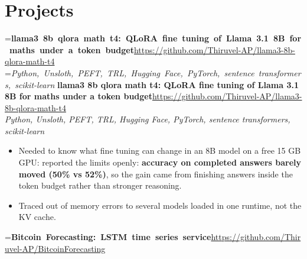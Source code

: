 \documentclass[a4paper,11pt]{article}
\newcommand{\project}[3]{%
  \textbf{#1}\hfill#3\\ {\color{muted}\small\textit{#2}}\par}
\newcommand{\gap}{\vspace{5pt}}
\newcommand{\num}[1]{\textbf{#1}}   %
\begin{document}
\section{Projects}
=\hbox{\textbf{llama3 8b qlora math t4: QLoRA fine tuning of Llama 3.1 8B for maths under a token budget}\hspace{1em}\url{https://github.com/Thiruvel-AP/llama3-8b-qlora-math-t4}}%
=\hbox{{\small\textit{Python, Unsloth, PEFT, TRL, Hugging Face, PyTorch, sentence transformers, scikit-learn}}}%
\ifdim\wd0>\linewidth
\ifdim\wd2>\linewidth
\textbf{llama3 8b qlora math t4: QLoRA fine tuning of Llama 3.1 8B for maths under a token budget}\\ {\color{muted}\small\textit{Python, Unsloth, PEFT, TRL, Hugging Face, PyTorch, sentence transformers, scikit-learn}}\\ \hspace*{\fill}{\small\url{https://github.com/Thiruvel-AP/llama3-8b-qlora-math-t4}}\par
\else
\textbf{llama3 8b qlora math t4: QLoRA fine tuning of Llama 3.1 8B for maths under a token budget}\\ {\color{muted}\small\textit{Python, Unsloth, PEFT, TRL, Hugging Face, PyTorch, sentence transformers, scikit-learn}}\hfill{\small\url{https://github.com/Thiruvel-AP/llama3-8b-qlora-math-t4}}\par
\fi
\else
\project{llama3 8b qlora math t4: QLoRA fine tuning of Llama 3.1 8B for maths under a token budget}{Python, Unsloth, PEFT, TRL, Hugging Face, PyTorch, sentence transformers, scikit-learn}{\url{https://github.com/Thiruvel-AP/llama3-8b-qlora-math-t4}}
\fi
\begin{itemize}
  \item Needed to know what fine tuning can change in an 8B model on a free 15 GB GPU: reported the limits openly: \num{accuracy on completed answers barely moved (50\% vs 52\%)}, so the gain came from finishing answers inside the token budget rather than stronger reasoning.
  \item Traced out of memory errors to several models loaded in one runtime, not the KV cache.
\end{itemize}
\gap
{}
=\hbox{\textbf{Bitcoin Forecasting: LSTM time series service}\hspace{1em}\url{https://github.com/Thiruvel-AP/BitcoinForecasting}}%
\end{document}
